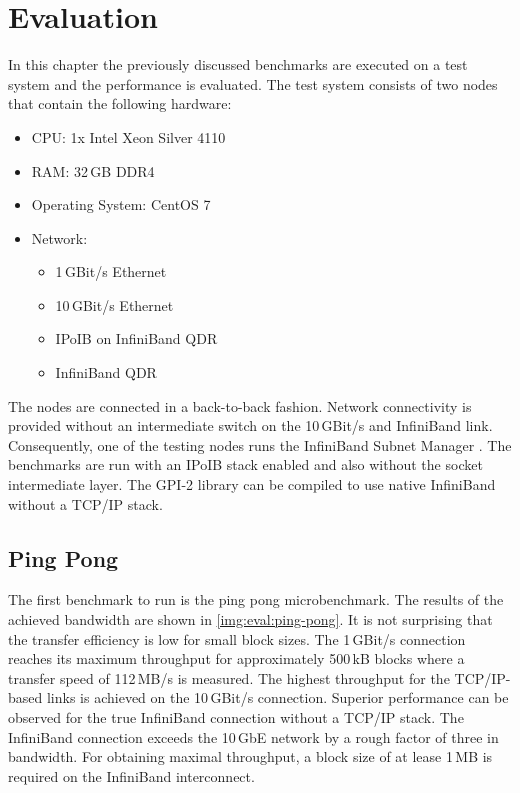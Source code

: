 \newcommand{\ubenchmaxtransfer}{16777220}


\chapter{Evaluation}

In this chapter the previously discussed benchmarks are executed on a test system and the performance is evaluated. The test system consists of two nodes that contain the following hardware:
\begin{itemize}
	\item CPU: 1x Intel Xeon Silver 4110
	\item RAM: 32\,GB DDR4
	\item Operating System: CentOS 7
	\item Network:
	\begin{itemize}
		\item 1\,GBit/s Ethernet
		\item 10\,GBit/s Ethernet
		\item \acs{IPoIB} on InfiniBand QDR
		\item InfiniBand QDR
	\end{itemize}
\end{itemize}

The nodes are connected in a back-to-back fashion. Network connectivity is provided without an intermediate switch on the 10\,GBit/s and InfiniBand link. Consequently, one of the testing nodes runs the InfiniBand Subnet Manager . The benchmarks are run with an \ac{IPoIB} stack enabled and also without the socket intermediate layer. The \ac{GPI}-2 library can be compiled to use native InfiniBand without a TCP/IP stack.

\section{Ping Pong}

The first benchmark to run is the ping pong microbenchmark. The results of the achieved bandwidth are shown in \autoref{img:eval:ping-pong}. It is not surprising that the transfer efficiency is low for small block sizes. The 1\,GBit/s connection reaches its maximum throughput for approximately 500\,kB blocks where a transfer speed of 112\,MB/s is measured. The highest throughput for the TCP/IP-based links is achieved on the 10\,GBit/s connection. Superior performance can be observed for the true InfiniBand connection without a TCP/IP stack. The InfiniBand connection exceeds the 10\,GbE network by a rough factor of three in bandwidth. For obtaining maximal throughput, a block size of at lease 1\,MB is required on the InfiniBand interconnect.

